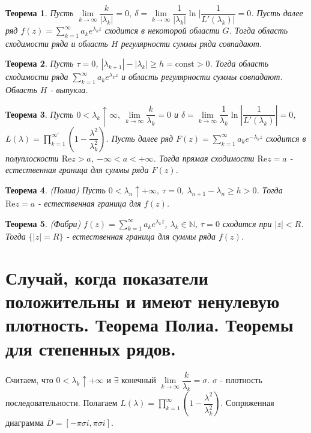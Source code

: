 \documentclass[9pt]{article}
\newtheorem{theorem}{Теорема} %
\begin{document}
				\begin{theorem}
					Пусть $\lim\limits_{k\to\infty} \dfrac{k}{|\lambda_k|} = 0, \ \delta = \lim\limits_{k\to\infty} \dfrac{1}{|\lambda_k|} \ln{|\dfrac{1}{L'(\lambda_k)|}} = 0$. Пусть далее ряд $f(z) = \sum\limits_{k=1}^{\infty} a_k e^{\lambda_k z}$ сходится в некоторой области $G$. Тогда область сходимости ряда и область $H$ регулярности суммы ряда совпадают.
				\end{theorem}
				\begin{theorem}
					Пусть $\tau = 0$, $|\lambda_{k+1}| - |\lambda_k| \geq h = \mathrm{const} > 0 $. Тогда область сходимости ряда $\sum\limits_{k=1}^{\infty} a_ke^{\lambda_k z}$ и область регулярности суммы совпадают. Область  $H$ - выпукла.
				\end{theorem}
				\begin{theorem}
					Пусть $0 < \lambda_k \uparrow \infty, \ \lim\limits_{k\to\infty}\dfrac{k}{\lambda_k} = 0$ и $\delta = \lim\limits_{k\to\infty} \dfrac{1}{\lambda_k} \ln{|\dfrac{1}{L'(\lambda_k)}|} = 0$, $L(\lambda) = \prod_{k=1}^{\infty'} \left(1  - \dfrac{\lambda^2}{\lambda_k^2}\right)$. Пусть далее ряд $F(z) = \sum\limits_{k=1}^{\infty} a_k e^{-\lambda_k z}$ сходится в полуплоскости $\mathrm{Re} z > a$,  $- \infty < a < + \infty$. Тогда прямая сходимости $\mathrm{Re}z = a$ - естественная граница для суммы ряда $F(z)$.
				\end{theorem}
				\begin{theorem}(Полиа)\newline
					Пусть $0 < \lambda_n \uparrow +\infty, \ \tau = 0$, $\lambda_{n+1} - \lambda_n \geq h > 0$. Тогда $\mathrm{Re} z= a$ - естественная граница для $f(z)$.
				\end{theorem}
				\begin{theorem}(Фабри)\newline
					$f(z) = \sum\limits_{k=1}^{\infty} a_k e^{\lambda_k z}$, $\lambda_k \in \mathbb{N}$, $\tau = 0$ сходится при $|z| < R$. Тогда $\{|z| = R\}$ - естественная граница для суммы ряда $f(z)$.
				\end{theorem}
			\section{ Случай, когда показатели положительны и имеют ненулевую плотность. Теорема Полиа. Теоремы для степенных рядов.}
				Считаем, что $0 < \lambda_k \uparrow + \infty$ и $\exists$ конечный $\lim\limits_{k\to\infty} \dfrac{k}{\lambda_k} = \sigma$. $\sigma$ - плотность последовательности. Полагаем $L(\lambda) = \prod_{k=1}^{\infty} \left(1 - \dfrac{\lambda^2}{\lambda_k^2}\right)$. Сопряженная диаграмма $\overline{D} = [-\pi \sigma i, \pi \sigma i]$.
				
\end{document}
